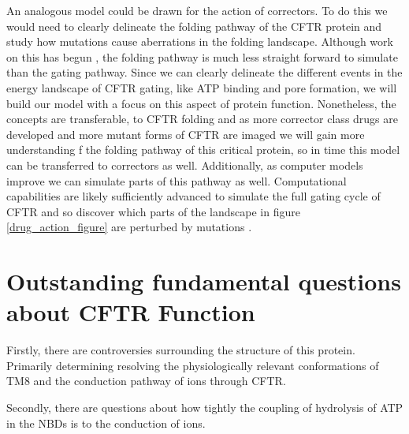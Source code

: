 An analogous model could be drawn for the action of correctors. To do this we would need to clearly delineate the folding pathway of the CFTR protein and study how mutations cause aberrations in the folding landscape. Although work on this has begun \cite{krainer2018, kleizen2021, kleizen2020, fiedorczuk2022}, the folding pathway is much less straight forward to simulate than the gating pathway. Since we can clearly delineate the different events in the energy landscape of CFTR gating, like ATP binding and pore formation, we will build our model with a focus on this aspect of protein function. Nonetheless, the concepts are transferable, to CFTR folding and as more corrector class drugs are developed and more mutant forms of CFTR are imaged we will gain more understanding f the folding pathway of this critical protein, so in time this model can be transferred to correctors as well. Additionally, as computer models improve we can simulate parts of this pathway as well. Computational capabilities are likely sufficiently advanced to simulate the full gating cycle of CFTR and so discover which parts of the landscape in figure \ref{drug_action_figure} are perturbed by mutations \cite{}. 


\section{Outstanding fundamental questions about CFTR Function}
Firstly, there are controversies surrounding the structure of this protein. Primarily determining resolving the physiologically relevant conformations of TM8 and the conduction pathway of ions through CFTR.

Secondly, there are questions about how tightly the coupling of hydrolysis of ATP in the NBDs is to the conduction of ions.

